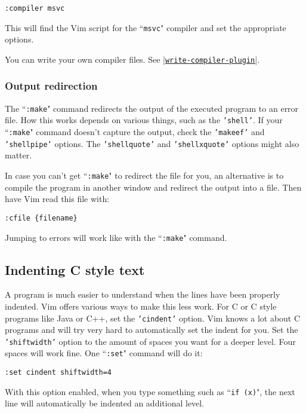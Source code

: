 \begin{Verbatim}[samepage=true]
 :compiler msvc
\end{Verbatim}

This will find the Vim script for the ``\texttt{msvc}" compiler and set the appropriate options.

You can write your own compiler files.  See \hyperref[write-compiler-plugin]{|\texttt{write-compiler-plugin}|}.

\subsubsection{Output redirection}
The ``\texttt{:make}" command redirects the output of the executed program to an error file.
How this works depends on various things, such as the \texttt{'shell'}.
If your ``\texttt{:make}" command doesn't capture the output, check the \texttt{'makeef'} and \texttt{'shellpipe'} options.
The \texttt{'shellquote'} and \texttt{'shellxquote'} options might also matter.

In case you can't get ``\texttt{:make}" to redirect the file for you, an alternative is to compile the program in another window and redirect the output into a file.
Then have Vim read this file with:

\begin{Verbatim}[samepage=true]
 :cfile {filename}
\end{Verbatim}

Jumping to errors will work like with the ``\texttt{:make}" command.
\subsection{Indenting C style text}
A program is much easier to understand when the lines have been properly indented.
Vim offers various ways to make this less work.
For C or C style programs like Java or C++, set the \texttt{'cindent'} option.
Vim knows a lot about C programs and will try very hard to automatically set the indent for you.
Set the \texttt{'shiftwidth'} option to the amount of spaces you want for a deeper level.
Four spaces will work fine.
One ``\texttt{:set}" command will do it:

\begin{Verbatim}[samepage=true]
 :set cindent shiftwidth=4
\end{Verbatim}

With this option enabled, when you type something such as ``\texttt{if (x)}", the next line will automatically be indented an additional level.

